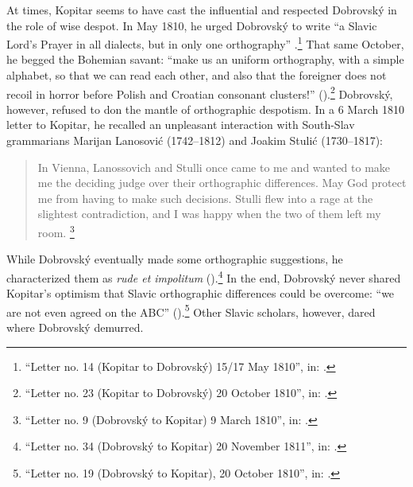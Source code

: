 At times, Kopitar seems to have cast the influential and respected Dobrovský in the role of wise despot. In May 1810, he urged Dobrovský to write “a Slavic Lord’s Prayer in all dialects, but in only one orthography” \citep[148]{jagic_pisma_1895}.\footnote{“Letter no. 14 (Kopitar to Dobrovský) 15/17 May 1810”, in: \citet[148]{jagic_pisma_1895}.} That same October, he begged the Bohemian savant: “make us an uniform orthography, with a simple alphabet, so that we can read each other, and also that the foreigner does not recoil in horror before Polish and Croatian consonant clusters!” (\citeyear[179]{jagic_pisma_1895}).\footnote{“Letter no. 23 (Kopitar to Dobrovský) 20 October 1810”, in: \citet[179]{jagic_pisma_1895}.} Dobrovský, however, refused to don the mantle of orthographic despotism. In a 6 March 1810 letter to Kopitar, he recalled an unpleasant interaction with South-Slav grammarians Marijan Lanosović (1742--1812) and Joakim Stulić (1730--1817):

\begin{quote}
    In Vienna, Lanossovich and Stulli once came to me and wanted to make me the deciding judge over their orthographic differences. May God protect me from having to make such decisions. Stulli flew into a rage at the slightest contradiction, and I was happy when the two of them left my room. \citep[108]{jagic_pisma_1895}\footnote{“Letter no. 9 (Dobrovský to Kopitar) 9 March 1810”, in: \citet[108]{jagic_pisma_1895}.}
\end{quote}

\noindent While Dobrovský eventually made some orthographic suggestions, he characterized them as \textit{rude et impolitum} (\citeyear[230]{jagic_pisma_1895}).\footnote{“Letter no. 34 (Dobrovský to Kopitar) 20 November 1811”, in: \citet[230]{jagic_pisma_1895}.} In the end, Dobrovský never shared Kopitar’s optimism that Slavic orthographic differences could be overcome: “we are not even agreed on the ABC” (\citeyear[172]{jagic_pisma_1895}).\footnote{“Letter no. 19 (Dobrovský to Kopitar), 20 October 1810”, in: \citet[172]{jagic_pisma_1895}.} Other Slavic scholars, however, dared where Dobrovský demurred.

